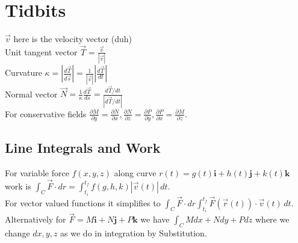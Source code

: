 \documentclass[10pt,landscape,letterpaper]{cheatsheet}
\newcommand{\ui}{\mathbf{i}}
\newcommand{\uj}{\mathbf{j}}
\newcommand{\uk}{\mathbf{k}}
\begin{document}

\section*{Tidbits}
$\vec{v}$ here is the velocity vector (duh)\\
Unit tangent vector $\vec{T}=\frac{\vec{v}}{\left|\vec{v}\right|}$\\
Curvature $\kappa=\left|\frac{d\vec{T}}{d\vec{s}}\right|=\frac{1}{\left|\vec{v}\right|}\left|\frac{d\vec{T}}{dt}\right|$\\
Normal vector $\vec{N}=\frac{1}{\kappa}\frac{d\vec{T}}{ds}=\frac{d\vec{T}/dt}{\left|d\vec{T}/dt\right|}$\\
For conservative fields
$\frac{\partial M}{\partial y}=\frac{\partial N}{\partial x},
        \frac{\partial N}{\partial z}=\frac{\partial P}{\partial y},
        \frac{\partial P}{\partial x}=\frac{\partial M}{\partial z}.
$
\subsection{Line Integrals and Work}
For variable force $f(x,y,z)$ along curve $r(t)=g(t)\ui+h(t)\uj+k(t)\uk$
work is $\int_C\vec{F}\cdot dr=\int_{t_i}^{t_f}f(g,h,k)\left|\vec{v}(t)\right|\,dt$.\\
For vector valued functions it simplifies to
$\int_C\vec{F}\cdot dr\int_{t_i}^{t_f}\vec{F}(\vec{r}(t))\cdot\vec{v}(t)\,dt$.\\
Alternatively for
$\vec{F}=M\ui+N\uj+P\uk$
we have $\int_CMdx+Ndy+Pdz$ where we change $dx,y,z$ as we do in integration by Substitution.
\end{document}

